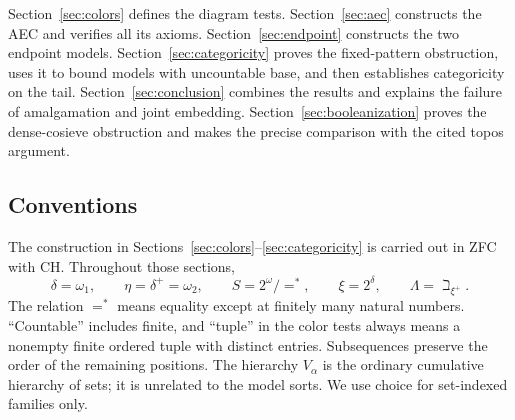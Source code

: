 Section~\ref{sec:colors} defines the diagram tests.
Section~\ref{sec:aec} constructs the AEC and verifies all its axioms.
Section~\ref{sec:endpoint} constructs the two endpoint models.
Section~\ref{sec:categoricity} proves the fixed-pattern obstruction,
uses it to bound models with uncountable base, and then establishes
categoricity on the tail. Section~\ref{sec:conclusion} combines the
results and explains the failure of amalgamation and joint embedding.
Section~\ref{sec:booleanization} proves the dense-cosieve obstruction
and makes the precise comparison with the cited topos argument.

\subsection{Conventions}

The construction in Sections~\ref{sec:colors}--\ref{sec:categoricity} is
carried out in ZFC with CH. Throughout those sections,
\begin{equation}\label{eq:standing-cardinals}
 \delta=\omega_1,\qquad \eta=\delta^+=\omega_2,\qquad
 S=2^\omega/=^*,\qquad \xi=2^\delta,\qquad
 \Lambda=\beth_{\xi^+}.
\end{equation}
The relation \(=^*\) means equality except at finitely many natural
numbers. ``Countable'' includes finite, and ``tuple'' in the color
tests always means a nonempty finite ordered tuple with distinct
entries. Subsequences preserve the order of the remaining positions.
The hierarchy \(V_\alpha\) is the ordinary cumulative hierarchy of
sets; it is unrelated to the model sorts. We use choice for set-indexed
families only.
